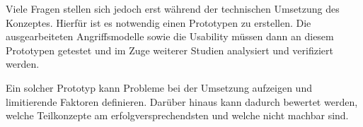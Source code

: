 \documentclass{sigchi}
\begin{document}
Viele Fragen stellen sich jedoch erst während der technischen Umsetzung des Konzeptes. Hierfür ist es notwendig einen Prototypen zu erstellen. Die ausgearbeiteten Angriffsmodelle sowie die Usability müssen dann an diesem Prototypen getestet und im Zuge weiterer Studien analysiert und verifiziert werden.

Ein solcher Prototyp kann Probleme bei der Umsetzung aufzeigen und limitierende Faktoren definieren. Darüber hinaus kann dadurch bewertet werden, welche Teilkonzepte am erfolgversprechendsten und welche nicht machbar sind.


\balance{}




\clearpage
\onecolumn
\end{document}
